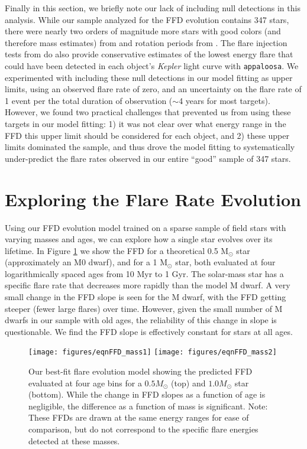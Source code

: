 \documentclass[preprint2]{aastex62}
\newcommand{\Kepler}{\textsl{Kepler}\xspace}
\begin{document}
Finally in this section, we briefly note our lack of including null detections in this analysis. While our sample analyzed for the FFD evolution contains 347 stars, there were nearly two orders of magnitude more stars with good colors (and therefore mass estimates) from \citet{davenport2016} and rotation periods from \citet{mcquillan2014}. The flare injection tests from \citet{davenport2016} do also provide conservative estimates of the lowest energy flare that could have been detected in each object's \Kepler light curve with {\tt appaloosa}. We experimented with including these null detections in our model fitting as upper limits, using an observed flare rate of zero, and an uncertainty on the flare rate of 1 event per the total duration of observation ($\sim$4 years for most targets). However, we found two practical challenges that prevented us from using these targets in our model fitting: 1) it was not clear over what energy range in the FFD this upper limit should be considered for each object, and 2) these upper limits dominated the sample, and thus drove the model fitting to systematically under-predict the flare rates observed in our entire ``good'' sample of 347 stars. 





\section{Exploring the Flare Rate Evolution}
\label{sec:model}


Using our FFD evolution model trained on a sparse sample of field stars with varying masses and ages, we can explore how a single star evolves over its lifetime. In Figure \ref{fig:model} we show the FFD for a theoretical 0.5 M$_\odot$ star (approximately an M0 dwarf), and for a 1 M$_\odot$ star, both evaluated at four logarithmically spaced ages from 10 Myr to 1 Gyr. The solar-mass star has a specific flare rate that decreases more rapidly than the model M dwarf. A very small change in the FFD slope is seen for the M dwarf, with the FFD getting steeper (fewer large flares) over time. However, given the small number of M dwarfs in our sample with old ages, the reliability of this change in slope is questionable. We find the FFD slope is effectively constant for stars at all ages.


\begin{figure}[!t]
\centering
\texttt{[image: figures/eqnFFD\_mass1]}
\texttt{[image: figures/eqnFFD\_mass2]}
\caption{
Our best-fit flare evolution model showing the predicted FFD evaluated at four age bins for a $0.5 M_\odot$ (top) and $1.0 M_\odot$ star (bottom). While the change in FFD slopes as a function of age is negligible, the difference as a function of mass is significant. Note: These FFDs are drawn at the same energy ranges for ease of comparison, but do not correspond to the specific flare energies detected at these masses.
}
\label{fig:model}
\end{figure}
\end{document}
